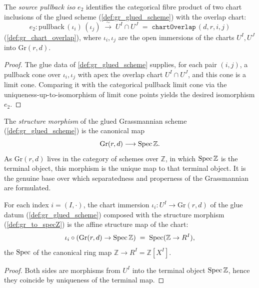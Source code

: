 \begin{definition}\leanok
  \label{def:gr_pullbackιIso}
  The \emph{source pullback iso} \(e_2\) identifies the categorical fibre product
  of two chart inclusions of the glued scheme (\cref{def:gr_glued_scheme}) with
  the overlap chart:
  \[
    e_2 : \mathrm{pullback}\,(\iota_i)\,(\iota_j) \;\xrightarrow{\;\sim\;}\;
    U^I \cap U^J \;=\; \texttt{chartOverlap}\,(d,r,i,j)
  \]
  (\cref{def:gr_chart_overlap}), where \(\iota_i, \iota_j\) are the open
  immersions of the charts \(U^I, U^J\) into \(\mathrm{Gr}(r,d)\).
\end{definition}
\begin{proof}
  \leanok
  The glue data of \cref{def:gr_glued_scheme} supplies, for each pair \((i,j)\), a
  pullback cone over \(\iota_i, \iota_j\) with apex the overlap chart \(U^I \cap
  U^J\), and this cone is a limit cone. Comparing it with the categorical
  pullback limit cone via the uniqueness-up-to-isomorphism of limit cone points
  yields the desired isomorphism \(e_2\).
\end{proof}

\begin{definition}\leanok
  \label{def:gr_to_specZ}
  The \emph{structure morphism} of the glued Grassmannian scheme
  (\cref{def:gr_glued_scheme}) is the canonical map
  \[
    \mathrm{Gr}(r,d) \longrightarrow \operatorname{Spec} \mathbb{Z} .
  \]
  As \(\mathrm{Gr}(r,d)\) lives in the category of schemes over \(\mathbb{Z}\), in
  which \(\operatorname{Spec} \mathbb{Z}\) is the terminal object, this morphism is the unique
  map to that terminal object. It is the genuine base over which separatedness and
  properness of the Grassmannian are formulated.
\end{definition}

\begin{lemma}\leanok
  \label{lem:gr_ι_toSpecZ}
  For each index \(i = (I, \cdot)\), the chart immersion \(\iota_i : U^I \to
  \mathrm{Gr}(r,d)\) of the glue datum (\cref{def:gr_glued_scheme}) composed with
  the structure morphism (\cref{def:gr_to_specZ}) is the affine structure map of
  the chart:
  \[
    \iota_i \circ (\mathrm{Gr}(r,d) \to \operatorname{Spec} \mathbb{Z})
      \;=\; \operatorname{Spec}(\mathbb{Z} \to R^I),
  \]
  the \(\operatorname{Spec}\) of the canonical ring map \(\mathbb{Z} \to R^I =
  \mathbb{Z}[X^I]\).
\end{lemma}
\begin{proof}
  \leanok
  Both sides are morphisms from \(U^I\) into the terminal object \(\operatorname{Spec}
  \mathbb{Z}\), hence they coincide by uniqueness of the terminal map.
\end{proof}

